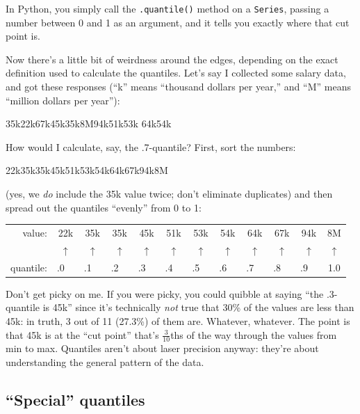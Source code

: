 In Python, you simply call the \texttt{.quantile()} method on a
\texttt{Series}, passing a number between 0 and 1 as an argument, and it tells
you exactly where that cut point is.

Now there's a little bit of weirdness around the edges, depending on the exact
definition used to calculate the quantiles. Let's say I collected some salary
data, and got these responses (``k'' means ``thousand dollars per year,'' and
``M'' means ``million dollars per year''):

\begin{center}
35k\quad 22k\quad 67k\quad 45k\quad 35k\quad 8M\quad 94k\quad 51k\quad 53k\quad
64k\quad 54k
\end{center}

How would I calculate, say, the .7-quantile? First, sort the numbers:

\begin{center}
22k\quad 35k\quad 35k\quad 45k\quad 51k\quad 53k\quad 54k\quad 64k\quad 67k\quad 94k\quad 8M
\end{center}

(yes, we \textit{do} include the 35k value twice; don't eliminate duplicates)
and then spread out the quantiles ``evenly'' from 0 to 1:

\begin{center}
\scriptsize
\renewcommand{\arraystretch}{.7}
\begin{tabular}{rccccccccccc}
value: & 22k& 35k& 35k& 45k& 51k& 53k& 54k& 64k& 67k& 94k& 8M\\
& $\uparrow$ &
$\uparrow$ &
$\uparrow$ &
$\uparrow$ &
$\uparrow$ &
$\uparrow$ &
$\uparrow$ &
$\uparrow$ &
$\uparrow$ &
$\uparrow$ &
$\uparrow$ \\
quantile: & .0\ \ & .1\ \  & .2\ \  & .3\ \  & .4\ \  & .5\ \  & .6\ \  & .7\ \  & .8\ \  & .9\ \  & 1.0 \\
\end{tabular}
\end{center}

Don't get picky on me. If you were picky, you could quibble at saying ``the
.3-quantile is 45k'' since it's technically \textit{not} true that 30\% of the
values are less than 45k: in truth, 3 out of 11 (27.3\%) of them are. Whatever,
whatever. The point is that 45k is at the ``cut point'' that's
$\frac{3}{10}$ths of the way through the values from min to max. Quantiles
aren't about laser precision anyway: they're about understanding the general
pattern of the data.

\subsection{``Special'' quantiles}

